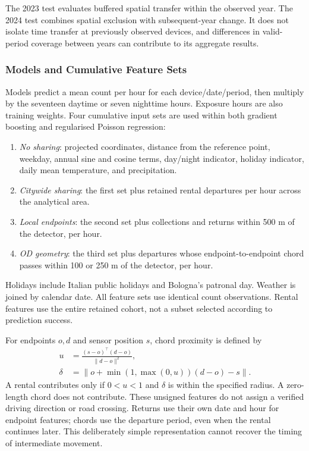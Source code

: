 \documentclass{interact}
\begin{document}
The 2023 test evaluates buffered spatial transfer within the observed year. The 2024 test combines spatial exclusion with subsequent-year change. It does not isolate time transfer at previously observed devices, and differences in valid-period coverage between years can contribute to its aggregate results.

\subsubsection{Models and Cumulative Feature Sets}
Models predict a mean count per hour for each device/date/period, then multiply by the seventeen daytime or seven nighttime hours. Exposure hours are also training weights. Four cumulative input sets are used within both gradient boosting and regularised Poisson regression:
\begin{enumerate}
\item \emph{No sharing}: projected coordinates, distance from the reference point, weekday, annual sine and cosine terms, day/night indicator, holiday indicator, daily mean temperature, and precipitation.
\item \emph{Citywide sharing}: the first set plus retained rental departures per hour across the analytical area.
\item \emph{Local endpoints}: the second set plus collections and returns within 500 m of the detector, per hour.
\item \emph{OD geometry}: the third set plus departures whose endpoint-to-endpoint chord passes within 100 or 250 m of the detector, per hour.
\end{enumerate}
Holidays include Italian public holidays and Bologna's patronal day. Weather is joined by calendar date. All feature sets use identical count observations. Rental features use the entire retained cohort, not a subset selected according to prediction success.

For endpoints $o,d$ and sensor position $s$, chord proximity is defined by
\begin{equation}
 \begin{aligned}
 u&=\frac{(s-o)^\top(d-o)}{\|d-o\|^2},\\
 \delta&=\|o+\min(1,\max(0,u))(d-o)-s\|.
 \end{aligned}
\end{equation}
A rental contributes only if $0<u<1$ and $\delta$ is within the specified radius. A zero-length chord does not contribute. These unsigned features do not assign a verified driving direction or road crossing. Returns use their own date and hour for endpoint features; chords use the departure period, even when the rental continues later. This deliberately simple representation cannot recover the timing of intermediate movement.
\end{document}
